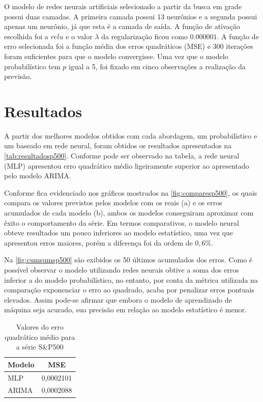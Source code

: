 \documentclass[
    12pt,
    oneside,
    a4paper,
    english,
    brazil
]{abntex2}
\begin{document}
O modelo  de redes neurais artificiais  selecionado a partir da  busca em grade
possui duas camadas.  A primeira camada possui 13 neurônios  e a segunda possui
apenas um  neurônio, já  que esta  é a camada  de saída.  A função  de ativação
escolhida  foi  a $relu$  e  o  valor  $\lambda$  da regularização  ficou  como
$0.000001$.  A  função  de  erro  selecionada foi  a  função  média  dos  erros
quadráticos  (MSE)  e  300  iterações  foram  suficientes  para  que  o  modelo
convergisse. Uma vez que o modelo probabilístico  tem $p$ igual a 5, foi fixado
em cinco observações a realização da previsão.

\chapter{Resultados}\label{chap:result}

A partir  dos melhores  modelos obtidos com  cada abordagem,  um probabilístico
e  um  baseado  em  rede  neural,  foram  obtidos  os  resultados  apresentados
na  \autoref{tab:resultadosp500}.  Conforme pode  ser  observado  na tabela,  a
rede neural  (MLP) apresentou  erro quadrático  médio ligeiramente  superior ao
apresentado pelo modelo ARIMA.

Conforme fica evidenciado nos gráficos mostrados na \autoref{fig:comparesp500},
os quais compara os valores previstos pelos modelos com os reais (a) e os erros
acumulados de cada modelo (b), ambos os modelos conseguiram aproximar com êxito
o  comportamento da  série.  Em  termos comparativos,  o  modelo neural  obteve
resultados um  pouco inferiores ao  modelo estatístico, uma vez  que apresentou
erros maiores, porém a diferença foi da ordem de $0,6\%$.

Na \autoref{fig:cumsumsp500} são  exibidos os 50 últimos  acumulados dos erros.
Como é  possível observar o modelo  utilizando redes neurais obtive  a soma dos
erros inferior  a do modelo  probabilístico, no  entanto, por conta  da métrica
utilizada na  comparação exponenciar  o erro ao  quadrado, acaba  por penalizar
erros  pontuais  elevados.  Assim  pode-se  afirmar  que  embora  o  modelo  de
aprendizado  de  máquina  seja  acurado,  sua precisão  em  relação  ao  modelo
estatístico é menor.

\begin{table}[ht]
    \centering
    \caption{Valores do erro quadrático médio para a série S\&P500}\label{tab:resultadosp500}
    \begin{tabular}{ll}
        \multicolumn{1}{c}{Modelo} & \multicolumn{1}{c}{MSE} \\
        \toprule
        MLP                        & 0,0002101               \\
        ARIMA                      & 0,0002088
    \end{tabular}
\end{table}
\end{document}

